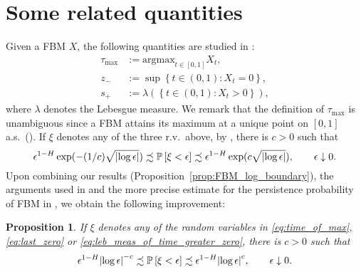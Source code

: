 \documentclass[11pt]{article}
\theoremstyle{plain}
\newtheorem{prop}[thm]{Proposition}
\theoremstyle{definition}
\begin{document}
\section{Some related quantities}\label{sec:fbm_rel_quant}
Given a FBM $X$, the following quantities are studied in \cite{molchan:1999a}:
\begin{align}
   \tau_{\max} & := \mathrm{argmax}_{t \in [0,1]} X_t, \label{eq:time_of_max}\\
  z_{-} & := \sup{ {\left\lbrace { t \in (0,1): X_t =0 } \right\rbrace} }, \label{eq:last_zero}\\
s_+ & := \lambda({\left\lbrace {t \in (0,1) : X_t > 0} \right\rbrace}), \label{eq:leb_meas_of_time_greater_zero}
\end{align}
where $\lambda$ denotes the Lebesgue measure. We remark that the definition of $\tau_{\max}$ is unambiguous since a FBM attains its maximum at a unique point on $[0,1]$ a.s.\ (\cite[Lemma~2.6]{kim-pollard:1990}). If $\xi$ denotes any of the three r.v.\ above, by \cite[Theorem~2]{molchan:1999a}, there is $c > 0$ such that
\[
  \epsilon^{1-H} \exp(-(1/c) \sqrt{  {\lvert{\log \epsilon}\rvert} }) \precsim {{{\bf {\mathbb{P}}}}\left[{\xi < \epsilon}\right]} \precsim \epsilon^{1-H} \exp(c\sqrt{{\lvert{\log \epsilon}\rvert}}), \qquad \epsilon \downarrow 0.
\]
Upon combining our results (Proposition~\ref{prop:FBM_log_boundary}), the arguments used in \cite{molchan:1999a} and the more precise estimate for the persistence probability of FBM in \cite{aurzada:2011}, we obtain the following improvement:
\begin{prop}\label{prop:FBM_related_quantities}
   If $\xi$ denotes any of the random variables in \eqref{eq:time_of_max}, \eqref{eq:last_zero} or \eqref{eq:leb_meas_of_time_greater_zero}, there is $c > 0$ such that
\begin{equation}\label{eq:lower_tail_rel_quant}
  \epsilon^{1-H} {\lvert{\log \epsilon}\rvert}^{-c} \precsim {{{\bf {\mathbb{P}}}}\left[{\xi < \epsilon}\right]} \precsim \epsilon^{1-H} {\lvert{\log \epsilon}\rvert}^c, \qquad \epsilon \downarrow 0.
\end{equation}
\end{prop}
\end{document}
